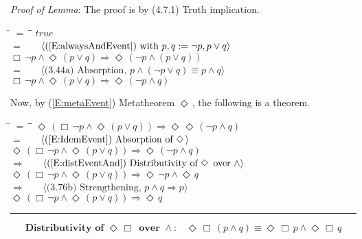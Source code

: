 \documentclass[12pt, fleqn, leqno]{article}
\newcommand{\lgap}{2pt}                             %
\newcommand{\mymathindent}{24pt}                    %
\newcommand{\impl}{\ensuremath{\Rightarrow}}        %
\newcommand{\Event}{\Diamond\,}
\newcommand{\Always}{\Box\,}
\newcommand{\myqed}{\rule[-.23ex]{1.2ex}{2.0ex}}
\newcommand{\myqedtab}{\hspace{384pt}}              %
\newcommand{\Gll} {\langle}                         %
\newcommand{\Ggg} {\rangle}                         %
\newcommand{\Hint}[1]     {\ \ \ $\Gll              \mbox{#1} \Ggg$ }   %
\begin{document}
\emph{Proof of Lemma}:
The proof is by (4.7.1) Truth implication.
\begin{tabbing}
\hspace{\mymathindent} \= $= \;$ \= \myqedtab \= \kill
  \> \>   $true$\\[\lgap]
  \> $=$  \>  \Hint{(\ref{E:alwaysAndEvent}) with $p,q:=\neg p, p\lor q$}\\[\lgap]
  \> \>   $\Always \neg p \land \Event (p\lor q) \impl \Event (\neg p \land (p\lor q))$\\[\lgap]
  \> $=$ \> \Hint{(3.44a) Absorption, $p\land (\neg p\lor q)\equiv p\land q$} \\[\lgap]
  \> \>   $\Always \neg p \land \Event (p\lor q) \impl \Event (\neg p \land q)$
\end{tabbing}
Now, by (\ref{E:metaEvent}) Metatheorem $\Event$, the following is a theorem.
\begin{tabbing}
\hspace{\mymathindent} \= $= \;$ \= \myqedtab \= \kill
  \> \>   $\Event(\Always \neg p \land \Event (p\lor q)) \impl \Event\Event (\neg p \land q)$\\[\lgap]
  \> $=$  \>  \Hint{(\ref{E:IdemEvent}) Absorption of $\Event$}\\[\lgap]
  \> \>   $\Event(\Always \neg p \land \Event (p\lor q)) \impl \Event (\neg p \land q)$\\[\lgap]
  \> $\impl$  \>  \Hint{(\ref{E:distEventAnd}) Distributivity of $\Event$ over $\land$}\\[\lgap]
  \> \>   $\Event(\Always \neg p \land \Event (p\lor q)) \impl \Event \neg p \land \Event q$\\[\lgap]
  \> $\impl$  \> \Hint{(3.76b) Strengthening, $p\land q \impl p$} \\[\lgap]
  \> \>   $\Event(\Always \neg p \land \Event (p\lor q)) \impl \Event q$ \quad \myqed
\end{tabbing}
\begin{equation}\label{E:distEventAlwaysAnd}
\textbf{Distributivity of $\Event\Always$ over $\land$:}\quad \Event\Always(p \land q) \equiv \Event\Always p \land \Event\Always q
\end{equation}
\end{document}
